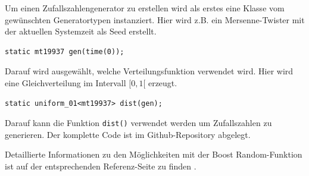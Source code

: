 \documentclass{book}
\begin{document}
\begin{refsection}
Um einen Zufallszahlengenerator zu erstellen wird als erstes eine Klasse vom gewünschten Generatortypen instanziert. Hier wird z.B. ein Mersenne-Twister mit der aktuellen Systemzeit als Seed erstellt.

\begin{lstlisting}[style=C]
static mt19937 gen(time(0));
\end{lstlisting}

Darauf wird ausgewählt, welche Verteilungsfunktion verwendet wird. Hier wird eine Gleichverteilung im Intervall $[0,1[$ erzeugt. 

\begin{lstlisting}[style=C]
static uniform_01<mt19937> dist(gen); 
\end{lstlisting}

Darauf kann die Funktion \texttt{dist()} verwendet werden um Zufallszahlen zu generieren. Der komplette Code ist im Github-Repository \cite{rng:githubRepo} abgelegt.

Detaillierte Informationen zu den Möglichkeiten mit der Boost Random-Funktion ist auf der entsprechenden Referenz-Seite zu finden \cite{rng:boostRandom}.


\newpage
\printbibliography[heading=subbibliography]
\end{refsection}
\end{document}
